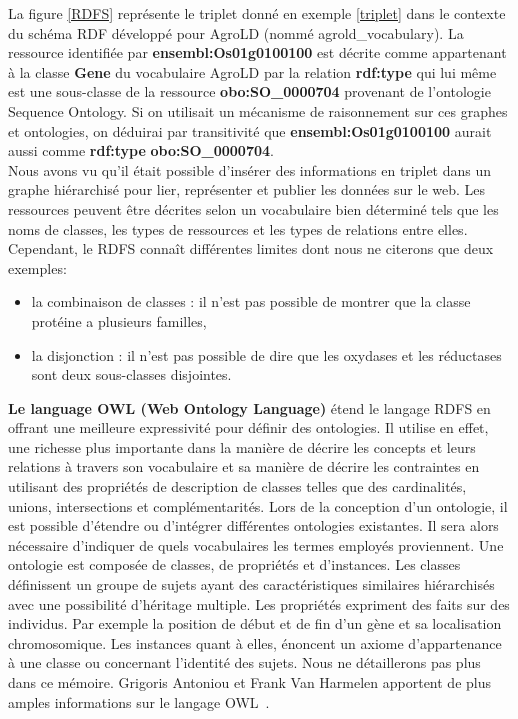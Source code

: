 La figure \ref{RDFS} représente le triplet donné en exemple \ref{triplet} dans le contexte du schéma RDF développé pour AgroLD (nommé agrold\_vocabulary). La ressource identifiée par \textbf{ensembl:Os01g0100100} est décrite comme appartenant à la classe \textbf{Gene} du vocabulaire AgroLD par la relation \textbf{rdf:type} qui lui même est une sous-classe de la ressource \textbf{obo:SO\_0000704} provenant de l'ontologie Sequence Ontology. Si on utilisait un mécanisme de raisonnement sur ces graphes et ontologies, on déduirai par transitivité que \textbf{ensembl:Os01g0100100} aurait aussi comme \textbf{rdf:type} \textbf{obo:SO\_0000704}.\\

Nous avons vu qu’il était possible d’insérer des informations en triplet dans un graphe hiérarchisé pour lier, représenter et publier les données sur le web. Les ressources peuvent être décrites selon un vocabulaire bien déterminé tels que les noms de classes, les types de ressources et les types de relations entre elles. Cependant, le RDFS connaît différentes limites dont nous ne citerons que deux exemples:\\
\begin{itemize}
\item la combinaison de classes : il n’est pas possible de montrer que la classe protéine a plusieurs familles,
\item la disjonction : il n’est pas possible de dire que les oxydases et les réductases sont deux sous-classes disjointes.\\
\end{itemize}


\textbf{Le language OWL (Web Ontology Language)} étend le langage RDFS en offrant une meilleure expressivité pour définir des ontologies. Il utilise en effet, une richesse plus importante dans la manière de décrire les concepts et leurs relations à travers son vocabulaire et sa manière de décrire les contraintes en utilisant des propriétés de description de classes telles que des cardinalités, unions, intersections et complémentarités. Lors de la conception d’un ontologie, il est possible d'étendre ou d'intégrer différentes ontologies existantes. Il sera alors nécessaire d'indiquer de quels vocabulaires les termes employés proviennent. Une ontologie est composée de classes, de propriétés et d'instances. Les classes définissent un groupe de sujets ayant des caractéristiques similaires hiérarchisés avec une possibilité d'héritage multiple. Les propriétés expriment des faits sur des individus. Par exemple la position de début et de fin d'un gène et sa localisation chromosomique. Les instances quant à elles, énoncent un axiome d'appartenance à une classe ou concernant l'identité des sujets. Nous ne détaillerons pas plus dans ce mémoire. Grigoris Antoniou et Frank Van Harmelen apportent de plus amples informations sur le langage OWL~\cite{Antoniou2009a}.\\

